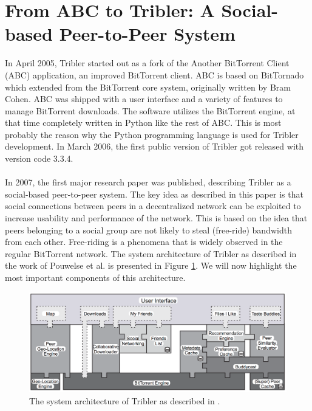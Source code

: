 \section{From ABC to Tribler: A Social-based Peer-to-Peer System}
In April 2005, Tribler started out as a fork of the Another BitTorrent Client (ABC) application, an improved BitTorrent client. ABC is based on BitTornado which extended from the BitTorrent core system, originally written by Bram Cohen. ABC was shipped with a user interface and a variety of features to manage BitTorrent downloads. The software utilizes the BitTorrent engine, at that time completely written in Python like the rest of ABC. This is most probably the reason why the Python programming language is used for Tribler development. In March 2006, the first public version of Tribler got released with version code 3.3.4.\\\\
In 2007, the first major research paper was published\cite{pouwelse2008tribler}, describing Tribler as a social-based peer-to-peer system. The key idea as described in this paper is that social connections between peers in a decentralized network can be exploited to increase usability and performance of the network. This is based on the idea that peers belonging to a social group are not likely to steal (free-ride) bandwidth from each other. Free-riding is a phenomena that is widely observed in the regular BitTorrent network. The system architecture of Tribler as described in the work of Pouwelse et al. is presented in Figure \ref{fig:tribler-architecture-2008}. We will now highlight the most important components of this architecture.

\begin{figure}[t]
	\centering
	\includegraphics[width=1.0\columnwidth]{images/tribler_architecture_2007}
	\caption{The system architecture of Tribler as described in \cite{pouwelse2008tribler}.}
	\label{fig:tribler-architecture-2008}
\end{figure}

